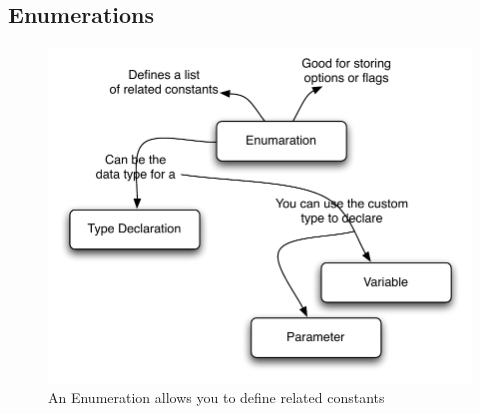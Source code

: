 \clearpage
\subsection{Enumerations} %
\label{sub:enumerations}

\begin{figure}[h]
   \centering
   \includegraphics[width=\textwidth]{./topics/type-decl/diagrams/Enum} 
   \caption{An Enumeration allows you to define related constants}
   \label{fig:type-decl-enum}
\end{figure}

